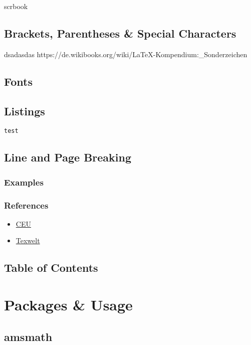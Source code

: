 scrbook \autocite{KOH01}
\subsection{Brackets, Parentheses \& Special Characters}
dsadasdas
https://de.wikibooks.org/wiki/LaTeX-Kompendium:\_Sonderzeichen
\subsection{Fonts}
\subsection{Listings}

\begin{lstlisting}[style=cstm-lists-latex-sty]
test
\end{lstlisting}


\subsection{Line and Page Breaking}
\subsubsection{Examples}
\subsubsection{References}
\begin{itemize}
    \item{\href{http://www.personal.ceu.hu/tex/breaking.htm} {CEU} \autocite{CEU01}}
    \item{\href{https://texwelt.de/wissen/fragen/4014/was-ist-der-unterschied-zwischen-newline-und-linebreak}{Texwelt}}
\end{itemize}


\subsection{Table of Contents}

\section{Packages \& Usage}
\subsection{amsmath}
